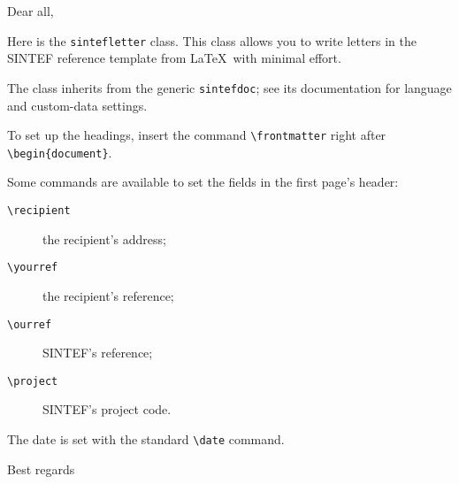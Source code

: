 \documentclass{sintefletter}
\begin{document}
\frontmatter
Dear all,

Here is the \texttt{sintefletter} class. This class allows you
to write letters in the SINTEF reference template from \LaTeX\ with
minimal effort.

The class inherits from the generic \texttt{sintefdoc}; see its
documentation for language and custom-data settings.

To set up the headings, insert the command \verb|\frontmatter|
right after \verb|\begin{document}|.

Some commands are available to set the fields in the first page's
header:
\begin{description}
\item[\texttt{\textbackslash recipient}] the recipient's address;
\item[\texttt{\textbackslash yourref}] the recipient's reference;
\item[\texttt{\textbackslash ourref}] SINTEF's reference;
\item[\texttt{\textbackslash project}] SINTEF's project code.
\end{description}

The date is set with the standard \verb|\date| command.

\closing{Best regards}
\end{document}
